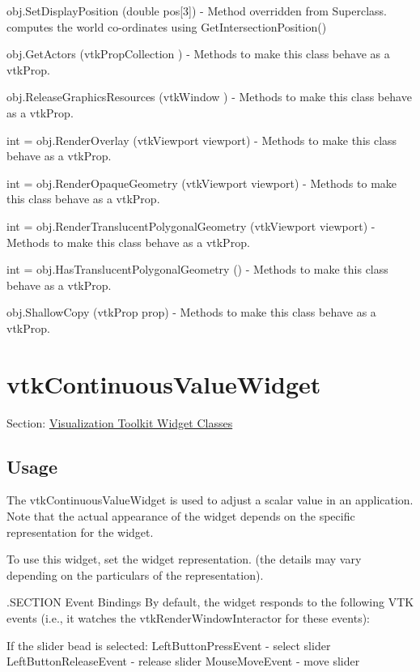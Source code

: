 \begin{DoxyItemize}
\item {\ttfamily obj.\-Set\-Display\-Position (double pos\mbox{[}3\mbox{]})} -\/ Method overridden from Superclass. computes the world co-\/ordinates using Get\-Intersection\-Position()  
\item {\ttfamily obj.\-Get\-Actors (vtk\-Prop\-Collection )} -\/ Methods to make this class behave as a vtk\-Prop.  
\item {\ttfamily obj.\-Release\-Graphics\-Resources (vtk\-Window )} -\/ Methods to make this class behave as a vtk\-Prop.  
\item {\ttfamily int = obj.\-Render\-Overlay (vtk\-Viewport viewport)} -\/ Methods to make this class behave as a vtk\-Prop.  
\item {\ttfamily int = obj.\-Render\-Opaque\-Geometry (vtk\-Viewport viewport)} -\/ Methods to make this class behave as a vtk\-Prop.  
\item {\ttfamily int = obj.\-Render\-Translucent\-Polygonal\-Geometry (vtk\-Viewport viewport)} -\/ Methods to make this class behave as a vtk\-Prop.  
\item {\ttfamily int = obj.\-Has\-Translucent\-Polygonal\-Geometry ()} -\/ Methods to make this class behave as a vtk\-Prop.  
\item {\ttfamily obj.\-Shallow\-Copy (vtk\-Prop prop)} -\/ Methods to make this class behave as a vtk\-Prop.  
\end{DoxyItemize}\hypertarget{vtkwidgets_vtkcontinuousvaluewidget}{}\section{vtk\-Continuous\-Value\-Widget}\label{vtkwidgets_vtkcontinuousvaluewidget}
Section\-: \hyperlink{sec_vtkwidgets}{Visualization Toolkit Widget Classes} \hypertarget{vtkwidgets_vtkxyplotwidget_Usage}{}\subsection{Usage}\label{vtkwidgets_vtkxyplotwidget_Usage}
The vtk\-Continuous\-Value\-Widget is used to adjust a scalar value in an application. Note that the actual appearance of the widget depends on the specific representation for the widget.

To use this widget, set the widget representation. (the details may vary depending on the particulars of the representation).

.S\-E\-C\-T\-I\-O\-N Event Bindings By default, the widget responds to the following V\-T\-K events (i.\-e., it watches the vtk\-Render\-Window\-Interactor for these events)\-: 
\begin{DoxyPre}
 If the slider bead is selected:
   LeftButtonPressEvent - select slider 
   LeftButtonReleaseEvent - release slider 
   MouseMoveEvent - move slider
 \end{DoxyPre}


